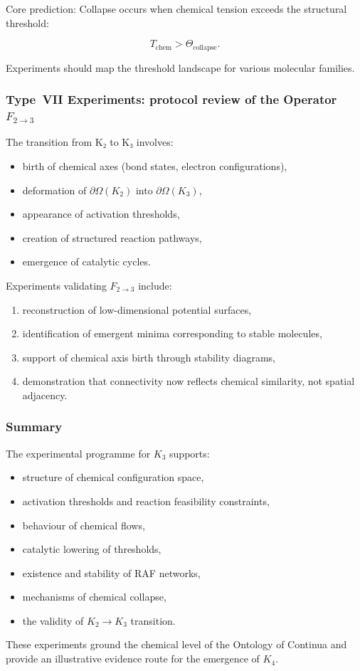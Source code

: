 Core prediction:
Collapse occurs when chemical tension exceeds the structural threshold:

\[
    T_{\mathrm{chem}} > \Theta_{\mathrm{collapse}}.
\]

Experiments should map the threshold landscape for various molecular families.



\subsubsection{Type~VII Experiments: protocol review of the Operator $F_{2\rightarrow 3}$}

The transition from K₂ to K₃ involves:

\begin{itemize}
    \item birth of chemical axes (bond states, electron configurations),
    \item deformation of $\partial\Omega(K_2)$ into $\partial\Omega(K_3)$,
    \item appearance of activation thresholds,
    \item creation of structured reaction pathways,
    \item emergence of catalytic cycles.
\end{itemize}

Experiments validating $F_{2\rightarrow 3}$ include:

\begin{enumerate}
    \item reconstruction of low-dimensional potential surfaces,
    \item identification of emergent minima corresponding to stable molecules,
    \item support of chemical axis birth through stability diagrams,
    \item demonstration that connectivity now reflects chemical similarity,
          not spatial adjacency.
\end{enumerate}



\subsubsection{Summary}

The experimental programme for $K_3$ supports:

\begin{itemize}
    \item structure of chemical configuration space,
    \item activation thresholds and reaction feasibility constraints,
    \item behaviour of chemical flows,
    \item catalytic lowering of thresholds,
    \item existence and stability of RAF networks,
    \item mechanisms of chemical collapse,
    \item the validity of $K_2 \rightarrow K_3$ transition.
\end{itemize}

These experiments ground the chemical level of the Ontology of Continua and
provide an illustrative evidence route for the emergence of $K_4$.
